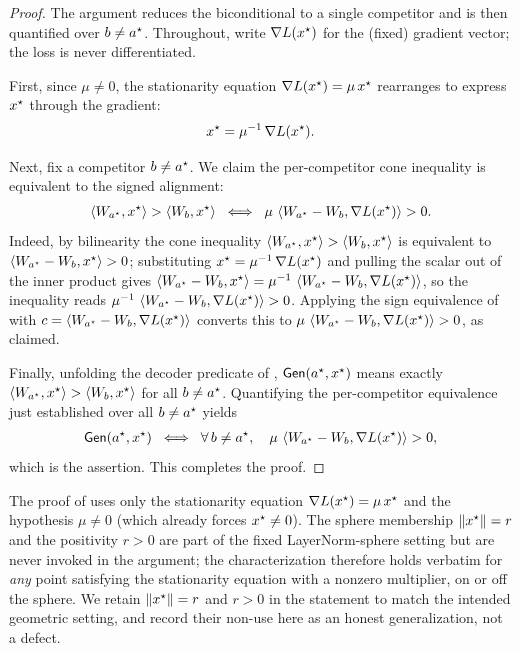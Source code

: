 \begin{proof}
The argument reduces the biconditional to a single competitor and is then quantified over
$b \ne a^{\star}$. Throughout, write $\nabla L(x^{\star})$ for the (fixed) gradient vector; the
loss is never differentiated.

First, since $\mu \ne 0$, the stationarity equation $\nabla L(x^{\star}) = \mu\,x^{\star}$
rearranges to express $x^{\star}$ through the gradient:
\begin{align*}
x^{\star} = \mu^{-1}\,\nabla L(x^{\star}).
\end{align*}

Next, fix a competitor $b \ne a^{\star}$. We claim the per-competitor cone inequality is
equivalent to the signed alignment:
\begin{align*}
\left\langle W_{a^{\star}}, x^{\star} \right\rangle > \left\langle W_{b}, x^{\star} \right\rangle
\;\iff\;
\mu\,\left\langle W_{a^{\star}} - W_{b}, \nabla L(x^{\star}) \right\rangle > 0.
\end{align*}
Indeed, by bilinearity the cone inequality $\left\langle W_{a^{\star}}, x^{\star} \right\rangle > \left\langle W_{b}, x^{\star} \right\rangle$
is equivalent to $\left\langle W_{a^{\star}} - W_{b}, x^{\star} \right\rangle > 0$; substituting
$x^{\star} = \mu^{-1}\,\nabla L(x^{\star})$ and pulling the scalar out of the inner product gives
$\left\langle W_{a^{\star}} - W_{b}, x^{\star} \right\rangle = \mu^{-1}\,\left\langle W_{a^{\star}} - W_{b}, \nabla L(x^{\star}) \right\rangle$,
so the inequality reads $\mu^{-1}\,\left\langle W_{a^{\star}} - W_{b}, \nabla L(x^{\star}) \right\rangle > 0$.
Applying the sign equivalence of  with
$c = \left\langle W_{a^{\star}} - W_{b}, \nabla L(x^{\star}) \right\rangle$ converts this to %
$\mu\,\left\langle W_{a^{\star}} - W_{b}, \nabla L(x^{\star}) \right\rangle > 0$, as claimed.

Finally, unfolding the decoder predicate of ,
$\mathsf{Gen}(a^{\star}, x^{\star})$ means exactly $\left\langle W_{a^{\star}}, x^{\star} \right\rangle > \left\langle W_{b}, x^{\star} \right\rangle$
for all $b \ne a^{\star}$. Quantifying the per-competitor equivalence just established over all
$b \ne a^{\star}$ yields
\begin{align*}
\mathsf{Gen}(a^{\star}, x^{\star})
\;\iff\;
\forall\, b \ne a^{\star},\quad \mu\,\left\langle W_{a^{\star}} - W_{b}, \nabla L(x^{\star}) \right\rangle > 0,
\end{align*}
which is the assertion. This completes the proof.
\end{proof}

\begin{remark}
\label{rem:generalization}
The proof of  uses only the stationarity equation
$\nabla L(x^{\star}) = \mu\,x^{\star}$ and the hypothesis $\mu \ne 0$ (which already forces
$x^{\star} \ne 0$). The sphere membership $\left\| x^{\star} \right\| = r$ and the positivity $r > 0$ are part
of the fixed LayerNorm-sphere setting but are never invoked in the argument; the
characterization therefore holds verbatim for \emph{any} point satisfying the stationarity
equation with a nonzero multiplier, on or off the sphere. We retain $\left\| x^{\star} \right\| = r$ and
$r > 0$ in the statement to match the intended geometric setting, and record their
non-use here as an honest generalization, not a defect.
\end{remark}

